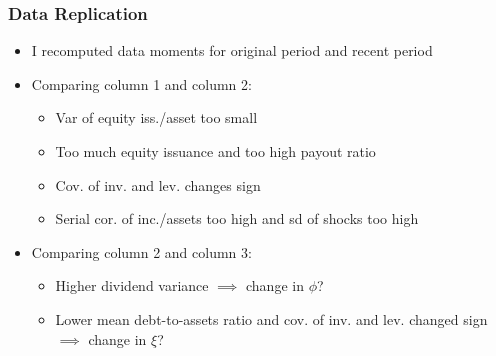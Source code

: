 \documentclass[usenames,dvipsnames, handout]{beamer}
\begin{document}
\begin{frame}
\frametitle{Data Replication}
\scriptsize
\begin{itemize}
\item I recomputed data moments for original period and recent period
\end{itemize}
\tiny
\begin{center}
\end{center}
\scriptsize
\begin{itemize}
\item Comparing column 1 and column 2:
\begin{itemize}
\scriptsize
\item Var of equity iss./asset too small
\item Too much equity issuance and too high payout ratio
\item Cov. of inv. and lev. changes sign
\item Serial cor. of inc./assets too high and sd of shocks too high
\end{itemize}

\item Comparing column 2 and column 3:
\begin{itemize}
\scriptsize
\item Higher dividend variance $\implies$ change in $\phi$?
\item Lower mean debt-to-assets ratio and cov. of inv. and lev. changed sign $\implies$ change in $\xi$?
\end{itemize}
\end{itemize}
\end{frame}
\end{document}
